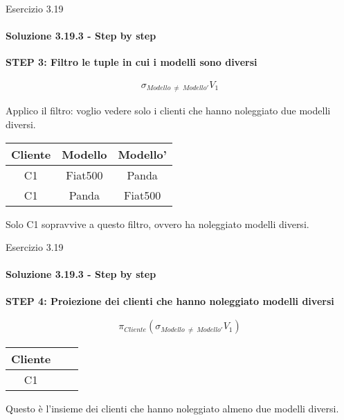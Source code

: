 \begin{frame}{Esercizio 3.19}
    \framesubtitle{Soluzione 3.19.3 - Step by step}
    \vspace*{-1cm}

    {\small \textbf{STEP 3: Filtro le tuple in cui i modelli sono diversi}}

    \small
    \begin{gather*}
        \sigma_{Modello~\neq~Modello'} V_1
    \end{gather*}

    Applico il filtro: voglio vedere solo i clienti che hanno noleggiato due modelli diversi.

    \centering
    \begin{tabular}{|c|c|c|}
    \hline
    \rowcolor{cyan!30} Cliente & Modello & Modello' \\
    \hline
    C1 & Fiat500 & Panda \\
    \hline
    C1 & Panda & Fiat500 \\
    \hline
    \end{tabular}

    \vspace{.3cm}

    Solo C1 sopravvive a questo filtro, ovvero ha noleggiato modelli diversi.

\end{frame}
%
\begin{frame}{Esercizio 3.19}
    \framesubtitle{Soluzione 3.19.3 - Step by step}
    \vspace*{-1cm}

    {\small \textbf{STEP 4: Proiezione dei clienti che hanno noleggiato modelli diversi}}

    \small
    \begin{gather*}
        \pi_{Cliente} (\sigma_{Modello~\neq~Modello'} V_1)
    \end{gather*}

    \centering
    \begin{tabular}{|c|c|c|}
    \hline
    \rowcolor{cyan!30} Cliente \\
    \hline
    C1 \\
    \hline
    \end{tabular}

    \vspace{.3cm}

    Questo \`e l'insieme dei clienti che hanno noleggiato almeno due modelli diversi.

\end{frame}
